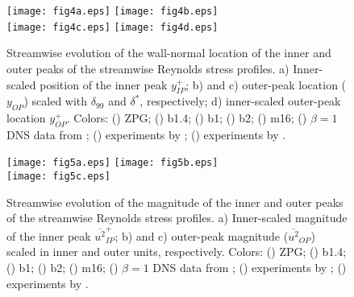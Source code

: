 \begin{figure}
\texttt{[image: fig4a.eps]}
\texttt{[image: fig4b.eps]} \\
\texttt{[image: fig4c.eps]}
\texttt{[image: fig4d.eps]}
\caption{Streamwise evolution of the wall-normal location of the inner and outer peaks of the streamwise Reynolds stress profiles. a) Inner-scaled position of the inner peak $y_{IP}^+$; b) and c) outer-peak location ($y_{OP}$) scaled with $\delta_{99}$ and $\delta^*$, respectively; d) inner-scaled outer-peak location $y^{+}_{OP}$. Colors: (\protect\blackline) ZPG; (\protect\orangeline) b1.4; (\protect\redline) b1; (\protect\greenline) b2; (\protect\blueline) m16; (\protect\magentaDiamond) $\beta=1$ DNS data from \cite{Kitsios2016}; (\protect\redcircle) experiments by \cite{MTL_expSANMIGUEL}; (\protect\blackSquare) experiments by \cite{skare_krogstad_1994}.}
\label{fig:uupeaks_loc}
\end{figure}
\begin{figure}
\texttt{[image: fig5a.eps]}
\texttt{[image: fig5b.eps]}\\
\texttt{[image: fig5c.eps]}
  \caption{Streamwise evolution of the magnitude of the inner and outer peaks of the streamwise Reynolds stress profiles. a) Inner-scaled magnitude of the inner peak $\overline{u^2}^+_{IP}$; b) and c) outer-peak magnitude ($\overline{u^2}_{OP}$) scaled in inner and outer units, respectively. Colors: (\protect\blackline) ZPG; (\protect\orangeline) b1.4; (\protect\redline) b1; (\protect\greenline) b2; (\protect\blueline) m16; (\protect\magentaDiamond) $\beta=1$ DNS data from \cite{Kitsios2016}; (\protect\redcircle) experiments by \cite{MTL_expSANMIGUEL}; (\protect\blackSquare) experiments by \cite{skare_krogstad_1994}. }
\label{fig:uupeaks_val}
\end{figure}

